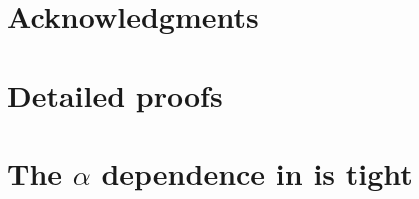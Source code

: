\documentclass[english,12pt]{article}\usepackage{lmodern} %
\theoremstyle{thmstyleone}%
\begin{document}
\section{Acknowledgments}


\clearpage
\newpage


\clearpage
\newpage
\begin{appendices}


\section{Detailed proofs}


\section{The $\alpha$ dependence in  is tight}


\clearpage
\newpage



\end{appendices}
\end{document}
